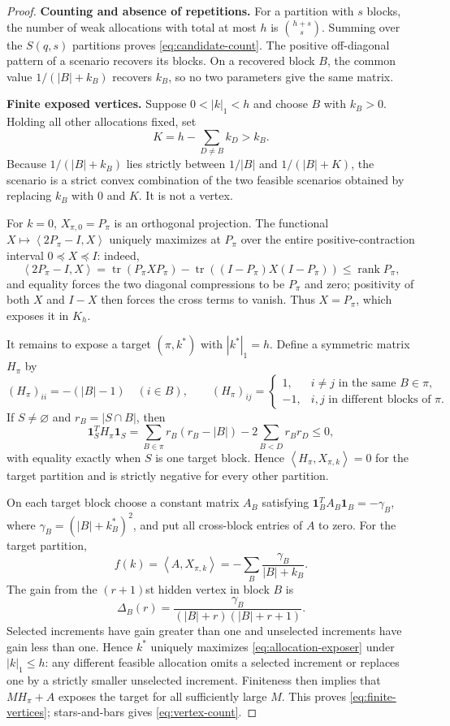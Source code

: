 \documentclass[11pt]{article}
\theoremstyle{definition}
\theoremstyle{remark}
\newcommand{\one}{\mathbf 1}
\newcommand{\tr}{\operatorname{tr}}
\newcommand{\rank}{\operatorname{rank}}
\newcommand{\ip}[2]{\left\langle #1,#2\right\rangle}
\begin{document}
\begin{proof}
\textbf{Counting and absence of repetitions.}
For a partition with $s$ blocks, the number of weak allocations with total at
most $h$ is $\binom{h+s}{s}$.  Summing over the $S(q,s)$ partitions proves
\eqref{eq:candidate-count}.  The positive off-diagonal pattern of a scenario
recovers its blocks.  On a recovered block $B$, the common value
$1/(|B|+k_B)$ recovers $k_B$, so no two parameters give the same matrix.

\textbf{Finite exposed vertices.}
Suppose $0<|k|_1<h$ and choose $B$ with $k_B>0$.  Holding all other
allocations fixed, set
\[
  K=h-\sum_{D\neq B}k_D>k_B.
\]
Because $1/(|B|+k_B)$ lies strictly between $1/|B|$ and
$1/(|B|+K)$, the scenario is a strict convex combination of the two feasible
scenarios obtained by replacing $k_B$ with $0$ and $K$.  It is not a vertex.

For $k=0$, $X_{\pi,0}=P_\pi$ is an orthogonal projection.  The functional
$X\mapsto\ip{2P_\pi-I}{X}$ uniquely maximizes at $P_\pi$ over the entire
positive-contraction interval $0\preceq X\preceq I$: indeed,
\[
 \ip{2P_\pi-I}{X}
 =\tr(P_\pi XP_\pi)-\tr((I-P_\pi)X(I-P_\pi))
 \leq\rank P_\pi,
\]
and equality forces the two diagonal compressions to be $P_\pi$ and zero;
positivity of both $X$ and $I-X$ then forces the cross terms to vanish.  Thus
$X=P_\pi$, which exposes it in $K_h$.

It remains to expose a target $(\pi,k^*)$ with $|k^*|_1=h$.  Define a symmetric
matrix $H_\pi$ by
\[
 (H_\pi)_{ii}=-(|B|-1)\quad(i\in B),
 \qquad
 (H_\pi)_{ij}=
 \begin{cases}
  1,&i\neq j\text{ in the same }B\in\pi,\\
  -1,&i,j\text{ in different blocks of }\pi.
 \end{cases}
\]
If $S\neq\varnothing$ and $r_B=|S\cap B|$, then
\begin{equation}
  \one_S^TH_\pi\one_S
  =\sum_{B\in\pi}r_B(r_B-|B|)
   -2\sum_{B<D}r_Br_D\leq0,
  \label{eq:partition-separator}
\end{equation}
with equality exactly when $S$ is one target block.  Hence
$\ip{H_\pi}{X_{\pi,k}}=0$ for the target partition and is strictly negative
for every other partition.

On each target block choose a constant matrix $A_B$ satisfying
$\one_B^TA_B\one_B=-\gamma_B$, where
$\gamma_B=(|B|+k_B^*)^2$, and put all cross-block entries of $A$ to zero.
For the target partition,
\begin{equation}
  f(k)=\ip{A}{X_{\pi,k}}
      =-\sum_B\frac{\gamma_B}{|B|+k_B}.
  \label{eq:allocation-exposer}
\end{equation}
The gain from the $(r+1)$st hidden vertex in block $B$ is
\[
  \Delta_B(r)
  =\frac{\gamma_B}{(|B|+r)(|B|+r+1)}.
\]
Selected increments have gain greater than one and unselected increments have
gain less than one.  Hence $k^*$ uniquely maximizes
\eqref{eq:allocation-exposer} under $|k|_1\leq h$: any different feasible
allocation omits a selected increment or replaces one by a strictly smaller
unselected increment.  Finiteness then implies
that $MH_\pi+A$ exposes the target for all sufficiently
large $M$.  This proves \eqref{eq:finite-vertices}; stars-and-bars gives
\eqref{eq:vertex-count}.


\end{proof}
\end{document}
